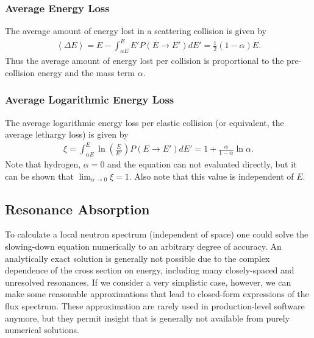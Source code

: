 \documentclass[11pt]{article}
\begin{document}
\subsubsection{Average Energy Loss}
\label{sec:orgheadline32}
The average amount of energy lost in a scattering collision is given by
\begin{align}
  \left< \Delta E \right> = E - \int_{\alpha E}^E E' P(E \rightarrow E') dE' = \frac{1}{2}(1-\alpha)E.
\end{align}
Thus the average amount of energy lost per collision is proportional to the pre-collision energy and the mass term \(\alpha\).

\subsubsection{Average Logarithmic Energy Loss}
\label{sec:orgheadline33}
The average logarithmic energy loss per elastic collision (or equivalent, the average lethargy loss) is given by
\begin{align}
  \xi = \int_{\alpha E}^E \ln\left(\frac{E}{E'}\right) P(E \rightarrow E') dE' = 1 + \frac{\alpha}{1-\alpha} \ln\alpha.
\end{align}
Note that hydrogen, \(\alpha = 0\) and the equation can not evaluated directly, but it can be shown that \(\lim_{\alpha \rightarrow 0} \xi = 1\).  Also note that this value is independent of \(E\).

\subsection{Resonance Absorption}
\label{sec:orgheadline38}
To calculate a local neutron spectrum (independent of space) one could solve the slowing-down equation numerically to an arbitrary degree of accuracy.  An analytically exact solution is generally not possible due to the complex dependence of the cross section on energy, including many closely-spaced and unresolved resonances.  If we consider a very simplistic case, however, we can make some reasonable approximations that lead to closed-form expressions of the flux spectrum.  These approximation are rarely used in production-level software anymore, but they permit insight that is generally not available from purely numerical solutions.  
\end{document}
